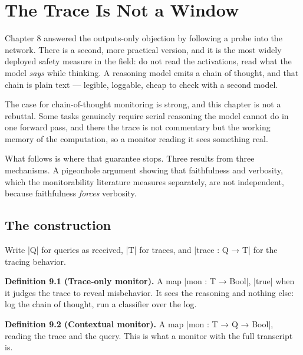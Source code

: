 \documentclass{memoir}
\begin{document}
\chapter{The Trace Is Not a Window}\label{Two--Schemas--of--Impossibility-005F-005F-005F--Machine--Checked--Limits--of--Trustworthy--Machine--Learning-005F-005F-005F--and--Why--They--Tighten--with--Capability----The--Trace--Is--Not--a--Window}

Chapter 8 answered the outputs-only objection by following a probe into the
network. There is a second, more practical version, and it is the most widely
deployed safety measure in the field: do not read the activations, read what the
model \emph{says} while thinking. A reasoning model emits a chain of thought, and
that chain is plain text — legible, loggable, cheap to check with a second
model.

The case for chain-of-thought monitoring is strong, and this chapter is not a
rebuttal. Some tasks genuinely require serial reasoning the model cannot do in
one forward pass, and there the trace is not commentary but the working memory
of the computation, so a monitor reading it sees something real.

What follows is where that guarantee stops. Three results from three mechanisms.
A pigeonhole argument showing that faithfulness and verbosity, which the
monitorability literature measures separately, are not independent, because
faithfulness \emph{forces} verbosity.



\section{The construction}\label{Two--Schemas--of--Impossibility-005F-005F-005F--Machine--Checked--Limits--of--Trustworthy--Machine--Learning-005F-005F-005F--and--Why--They--Tighten--with--Capability----The--Trace--Is--Not--a--Window----The--construction}

Write \LeanVerb|Q| for queries as received, \LeanVerb|T| for traces, and \LeanVerb|trace : Q → T| for the
tracing behavior.

\textbf{Definition 9.1 (Trace-only monitor).} A map \LeanVerb|mon : T → Bool|, \LeanVerb|true| when it judges
the trace to reveal misbehavior. It sees the reasoning and nothing else: log the
chain of thought, run a classifier over the log.

\textbf{Definition 9.2 (Contextual monitor).} A map \LeanVerb|mon : T → Q → Bool|, reading the trace
and the query. This is what a monitor with the full transcript is.
\end{document}

